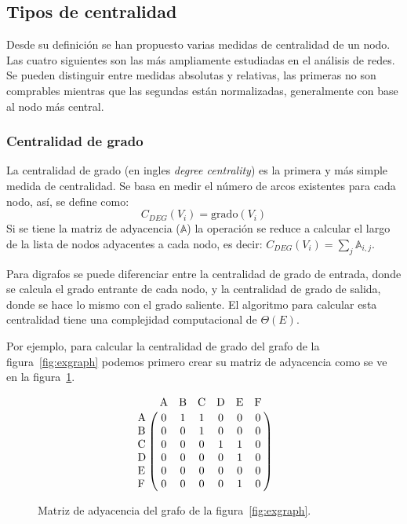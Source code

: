 \subsection{Tipos de centralidad}
Desde su definición se han propuesto varias medidas de centralidad de un nodo.
Las cuatro siguientes son las más ampliamente estudiadas en el análisis de redes.
Se pueden distinguir entre medidas absolutas y relativas, las primeras no son
comprables mientras que las segundas están normalizadas, generalmente con base
al nodo más central.

\subsubsection{Centralidad de grado}\label{ea:cent:degree}
La centralidad de grado (en ingles \emph{degree centrality}) es la primera y más
simple medida de centralidad\cite{sun2011survey}.
Se basa en medir el número de arcos existentes para cada nodo, así, se define
como: 
\begin{equation}
  \label{eq:deg}
  C_{DEG}(V_i) = \text{grado}(V_i)
\end{equation}
Si se tiene la matriz de adyacencia ($\mathbb{A}$) la operación se reduce a
calcular el largo de la lista de nodos adyacentes a cada nodo, es decir:
$ C_{DEG}(V_i) = \sum_{j} \mathbb{A}_{i,j}$.

Para digrafos se puede diferenciar entre la centralidad de grado de entrada,
donde se calcula el grado entrante de cada nodo, y la centralidad de grado de
salida, donde se hace lo mismo con el grado saliente. El algoritmo para calcular 
esta centralidad tiene una complejidad computacional de $\Theta (E)$.

Por ejemplo, para calcular la centralidad de grado del grafo de la
figura~\ref{fig:exgraph} podemos primero crear su matriz de adyacencia como se
ve en la figura~\ref{fig:adjmatrix}.

\begin{figure}[htpb]
  \begin{equation*}
    \bordermatrix{
       ~  & $A$ & $B$ & $C$ & $D$ & $E$ & $F$ \cr
      $A$ &  0  &  1  &  1  &  0  &  0  &  0  \cr
      $B$ &  0  &  0  &  1  &  0  &  0  &  0  \cr
      $C$ &  0  &  0  &  0  &  1  &  1  &  0  \cr
      $D$ &  0  &  0  &  0  &  0  &  1  &  0  \cr
      $E$ &  0  &  0  &  0  &  0  &  0  &  0  \cr
      $F$ &  0  &  0  &  0  &  0  &  1  &  0  \cr
    }
  \end{equation*}
  \caption{Matriz de adyacencia del grafo de la figura~\ref{fig:exgraph}.}
  \label{fig:adjmatrix}
\end{figure}

